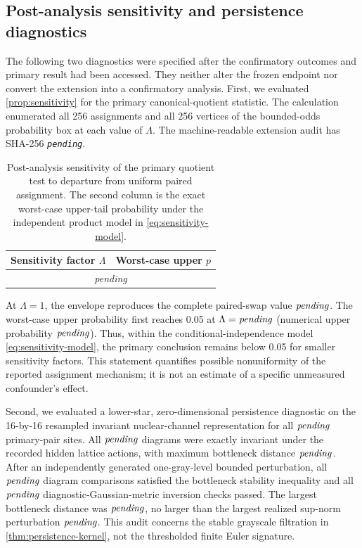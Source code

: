\documentclass[11pt]{article}
\theoremstyle{definition}
\theoremstyle{remark}
\newcommand{\1}{\mathbf 1}
\newcommand{\pending}{\textnormal{\textit{pending}}}
\newif\ifextensionsavailable
\newcommand{\RxSensitivityRows}{\multicolumn{2}{c}{\pending}\\}
\newcommand{\RxSensitivityCritical}{\pending}
\newcommand{\RxSensitivityCriticalP}{\pending}
\newcommand{\RxExtensionExactP}{\pending}
\newcommand{\RxPersistenceSites}{\pending}
\newcommand{\RxPersistenceInvariantChecks}{\pending}
\newcommand{\RxPersistenceStabilityChecks}{\pending}
\newcommand{\RxPersistenceKernelChecks}{\pending}
\newcommand{\RxPersistenceMaxExactBottleneck}{\pending}
\newcommand{\RxPersistenceMaxPerturbedBottleneck}{\pending}
\newcommand{\RxPersistenceMaxSupNorm}{\pending}
\newcommand{\RxExtensionAuditHash}{\pending}
\begin{document}
\ifextensionsavailable
\subsection{Post-analysis sensitivity and persistence diagnostics}

The following two diagnostics were specified after the confirmatory outcomes
and primary result had been accessed.  They neither alter the frozen endpoint
nor convert the extension into a confirmatory analysis.  First, we evaluated
\cref{prop:sensitivity} for the primary canonical-quotient statistic.  The
calculation enumerated all 256 assignments and all 256 vertices of the
bounded-odds probability box at each value of \(\Lambda\).  The machine-readable
extension audit has SHA-256
{\scriptsize\texttt{\RxExtensionAuditHash}}.

\begin{table}[htbp]
\centering
\caption{Post-analysis sensitivity of the primary quotient test to departure
from uniform paired assignment.  The second column is the exact worst-case
upper-tail probability under the independent product model in
\eqref{eq:sensitivity-model}.}
\label{tab:sensitivity}
\begin{tabular}{cc}
\toprule
Sensitivity factor \(\Lambda\) & Worst-case upper \(p\)\\
\midrule
\RxSensitivityRows
\bottomrule
\end{tabular}
\end{table}

At \(\Lambda=1\), the envelope reproduces the complete paired-swap value
\(\RxExtensionExactP\).  The worst-case upper probability first reaches 0.05
at \(\Lambda=\RxSensitivityCritical\) (numerical upper probability
\(\RxSensitivityCriticalP\)).  Thus, within the conditional-independence model
\eqref{eq:sensitivity-model}, the primary conclusion remains below 0.05 for
smaller sensitivity factors.  This statement quantifies possible
nonuniformity of the reported assignment mechanism; it is not an estimate of a
specific unmeasured confounder's effect.

Second, we evaluated a lower-star, zero-dimensional persistence diagnostic on
the 16-by-16 resampled invariant nuclear-channel representation for all
\(\RxPersistenceSites\) primary-pair sites.  All
\(\RxPersistenceInvariantChecks\) diagrams were exactly invariant under the
recorded hidden lattice actions, with maximum bottleneck distance
\(\RxPersistenceMaxExactBottleneck\).  After an independently generated
one-gray-level bounded perturbation, all \(\RxPersistenceStabilityChecks\)
diagram comparisons satisfied the bottleneck stability inequality and all
\(\RxPersistenceKernelChecks\) diagnostic-Gaussian-metric inversion checks
passed.  The
largest bottleneck distance was \(\RxPersistenceMaxPerturbedBottleneck\), no
larger than the largest realized sup-norm perturbation
\(\RxPersistenceMaxSupNorm\).  This audit concerns the stable grayscale
filtration in \cref{thm:persistence-kernel}, not the thresholded finite Euler
signature.
\else
\end{document}
